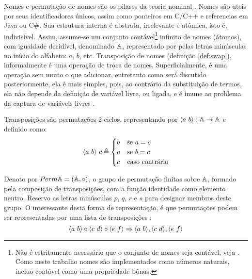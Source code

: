 Nomes e permutação de nomes são os pilares da teoria nominal \cite{Pitts2013,Gabbay2002,Pitts2003}. Nomes são uteis por seus identificadores únicos, assim como ponteiros em C/C++ e referencias em Java ou C\#. Sua estrutura interna é abstrata, irrelevante e atômica, isto é, indivisível. Assim, assume-se um conjunto contável\footnote{Não é estritamente necessário que o conjunto de nomes seja contável, veja \cite[Exercício 6.2, página 109]{Pitts2013}. Como neste trabalho nomes são implementados como números naturais, incluo contável como uma propriedade bônus.} infinito de nomes (átomos), com igualdade decidível, denominado $\mathbb{A}$, representado por pelas letras minúsculas no início do alfabeto: $a$, $b$, etc. Transposição de nomes (definição \ref{def:swap}), informalmente é uma operação de troca de nomes. Superficialmente, é uma operação sem muito o que adicionar, entretanto como será discutido posteriormente, 
ela é mais simples, pois, ao contrário da substituição de termos, ela não depende da definição de variável livre, ou ligada, e é imune ao problema da captura de variáveis livres \cite{Pitts2003}.
\begin{definicao}\label{def:swap}
	Transposições são permutações 2-ciclos, representando por $\langle a~b \rangle : \mathbb{A} \rightarrow \mathbb{A}$ e definido como:
	\begin{equation}
		\langle a~b \rangle ~c \triangleq 
		\begin{cases}
			b & \text{\normalfont se } a = c \\
			a & \text{\normalfont se } b = c \\
			c & \text{\normalfont caso contrário}
		\end{cases}
	\end{equation} 
\end{definicao}\noindent
Denoto por $Perm \mathbb{A} = (\mathbb{A}, \circ)$, o grupo de permutação finitas sobre $\mathbb{A}$, formado pela composição de transposições, com a função identidade como elemento neutro. Reservo as letras minúsculas $p$, $q$, $r$ e $s$ para designar membros deste grupo. O interessante desta forma de representação, é que permutações podem ser representadas por uma lista de transposições :
\begin{equation*}
	\langle a ~ b \rangle \circ \langle c ~ d \rangle \circ \langle e ~ f \rangle \Rightarrow \langle a ~ b \rangle, \langle c ~ d \rangle, \langle e ~ f \rangle
\end{equation*}

